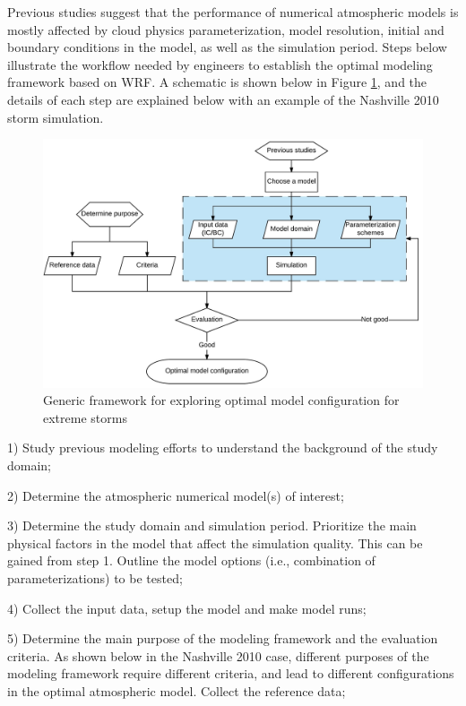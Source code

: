 Previous studies suggest that the performance of numerical atmospheric models is mostly affected by cloud physics parameterization, model resolution, initial and boundary conditions in the model, as well as the simulation period. Steps below illustrate the workflow needed by engineers to establish the optimal modeling framework based on WRF. A schematic is shown below in Figure \ref{fig:2-2}, and the details of each step are explained below with an example of the Nashville 2010 storm simulation.

\begin{figure}
  \includegraphics[width=\linewidth]{pics/ch2/fig2.jpg}
  \caption{Generic framework for exploring optimal model configuration for extreme storms}
  \label{fig:2-2}
\end{figure}

1) Study previous modeling efforts to understand the background of the study domain;

2) Determine the atmospheric numerical model(s) of interest;

3) Determine the study domain and simulation period. Prioritize the main physical factors in the model that affect the simulation quality. This can be gained from step 1. Outline the model options (i.e., combination of parameterizations) to be tested;

4) Collect the input data, setup the model and make model runs;

5) Determine the main purpose of the modeling framework and the evaluation criteria. As shown below in the Nashville 2010 case, different purposes of the modeling framework require different criteria, and lead to different configurations in the optimal atmospheric model. Collect the reference data;

